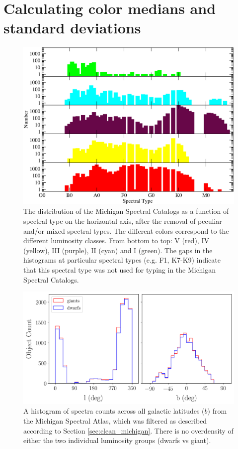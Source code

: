 \section{Calculating color medians and standard deviations}
\begin{figure}[t]
    \begin{center}
        \includegraphics[width=1.0\textwidth]{Figures/populations/hist-spt-count.pdf}
    \end{center}
\caption{The distribution of the Michigan Spectral Catalogs as a function of spectral type on the horizontal axis, after the removal of peculiar and/or mixed spectral types.  The different colors correspond to the different luminosity classes.  From bottom to top: V (red), IV (yellow), III (purple), II (cyan) and I (green).  The gaps in the histograms at particular spectral types (e.g. F1, K7-K9) indicate that this spectral type was not used for typing in the Michigan Spectral Catalogs.}
\end{figure}

\begin{figure}
    \centering
    \includegraphics[width=1.0\textwidth]{Figures/populations/hist-b-vs-count.png}
    \caption{A histogram of spectra counts across all galactic latitudes ($b$) from the Michigan Spectral Atlas, which was filtered as described according to Section \ref{sec:clean_michigan}. There is no overdensity of either the two individual luminosity groups (dwarfs vs giant).}
    \label{fig:b-vs-count}
\end{figure}



